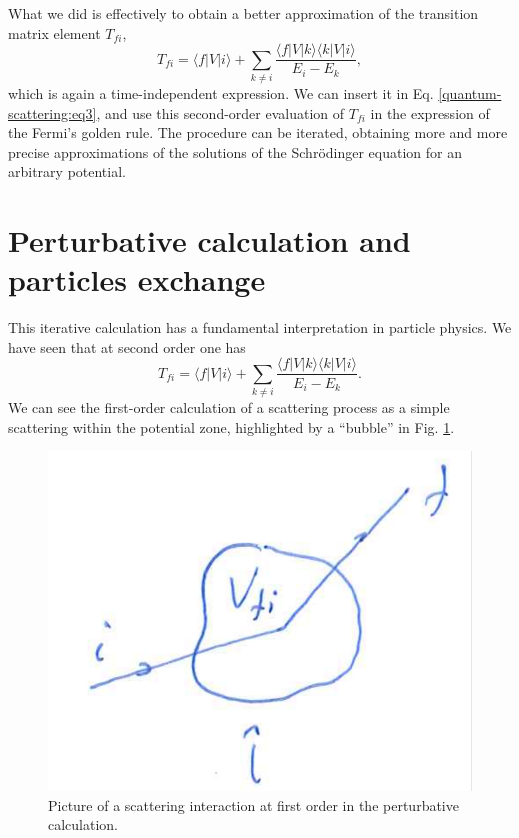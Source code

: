 What we did is effectively to obtain a better approximation of the transition matrix element $T_{fi}$,
\begin{equation*}
    T_{fi} = \langle f|V|i\rangle + \sum_{k\neq i}\frac{\langle f |V|k\rangle\langle k |V|i\rangle}{E_{i}-E_{k}},
\end{equation*}
which is again a time-independent expression. We can insert it in Eq. \eqref{quantum-scattering:eq3}, 
and use this second-order evaluation of $T_{fi}$ in the expression of the Fermi's golden rule. The procedure can be iterated, obtaining more and more precise approximations of the solutions of the Schr\"odinger equation for an arbitrary potential.

\section{Perturbative calculation and particles exchange}\label{sec:perturbativecalc}
This iterative calculation has a fundamental interpretation in particle physics.
We have seen that at second order one has
\begin{equation}\label{eq:reminderTfi}
    T_{fi} = \langle f |V| i\rangle + \sum_{k\neq i}\frac{\langle f|V|k\rangle\langle k |V|i \rangle}{E_{i}-E_{k}}.
\end{equation}
We can see the first-order calculation of a scattering process as a simple scattering within the potential zone, highlighted by a ``bubble'' in Fig. \ref{quantum-scattering:fig2}.
\begin{figure}[h]
    \centering
    \includegraphics[scale=0.3]{Figures/firstorder.pdf}
    \caption{Picture of a scattering interaction at first order in the perturbative calculation.}
    \label{quantum-scattering:fig2}
\end{figure}
